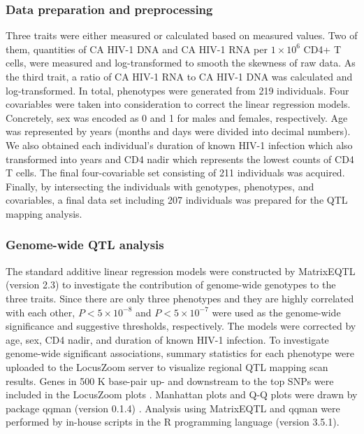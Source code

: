 \documentclass{book}
\begin{document}
\begin{refsection}
\subsubsection*{Data preparation and preprocessing}
Three traits were either measured or calculated based on measured values.
Two of them, quantities of CA HIV-1 DNA and CA HIV-1 RNA per $1 \times 10^6$ CD4+ T cells, were measured and log-transformed to smooth the skewness of raw data.
As the third trait, a ratio of CA HIV-1 RNA to CA HIV-1 DNA was calculated and log-transformed.
In total, phenotypes were generated from 219 individuals.
Four covariables were taken into consideration to correct the linear regression models.
Concretely, sex was encoded as 0 and 1 for males and females, respectively.
Age was represented by years (months and days were divided into decimal numbers).
We also obtained each individual's duration of known HIV-1 infection which also transformed into years and CD4 nadir which represents the lowest counts of CD4 T cells.
The final four-covariable set consisting of 211 individuals was acquired.
Finally, by intersecting the individuals with genotypes, phenotypes, and covariables, a final data set including 207 individuals was prepared for the QTL mapping analysis.

\subsubsection*{Genome-wide QTL analysis}
The standard additive linear regression models were constructed by MatrixEQTL (version 2.3) \cite{Shabalin2012Matrix} to investigate the contribution of genome-wide genotypes to the three traits.
Since there are only three phenotypes and they are highly correlated with each other, $P < 5 \times 10^{-8}$ and $P < 5 \times 10^{-7}$ were used as the genome-wide significance and suggestive thresholds, respectively.
The models were corrected by age, sex, CD4 nadir, and duration of known HIV-1 infection.
To investigate genome-wide significant associations, summary statistics for each phenotype were uploaded to the LocusZoom server to visualize regional QTL mapping scan results.
Genes in 500 K base-pair up- and downstream to the top SNPs were included in the LocusZoom plots \cite{Pruim2010LocusZoom}.
Manhattan plots and Q-Q plots were drawn by package qqman (version 0.1.4) \cite{D2018qqman}.
Analysis using MatrixEQTL and qqman were performed by in-house scripts in the R programming language (version 3.5.1).


\end{refsection}
\end{document}
